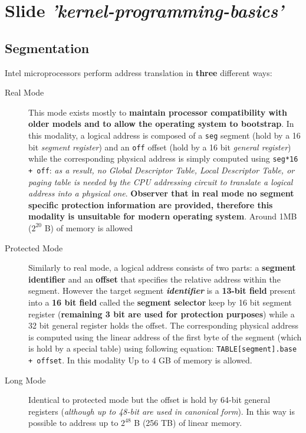 \documentclass[10pt,a4paper]{article}
\begin{document}
\newpage
\section{Slide \textit{'kernel-programming-basics'}}

\subsection{Segmentation}

Intel microprocessors perform address translation in \textbf{three} different ways:
\begin{description}
\item[Real Mode] This mode exists mostly to \textbf{maintain processor compatibility with older models and to allow the operating system to bootstrap}. In this modality, a logical address is composed of a \texttt{seg} segment (hold by a 16 bit \textit{segment register}) and an \texttt{off} offset (hold by a 16 bit \textit{general register}) while the corresponding physical address is simply computed using \texttt{seg*16 + off}: \textit{as a result, no Global Descriptor Table, Local Descriptor Table, or paging table is needed by the CPU addressing circuit to translate a logical address into a physical one}. \textbf{Observer that in real mode no segment specific protection information are provided, therefore this modality is unsuitable for modern operating system}. Around 1MB ($2^20$ B) of memory is allowed
\item[Protected Mode] Similarly to real mode, a logical address consists of two parts: a \textbf{segment identifier} and an \textbf{offset} that specifies the relative address within the segment. However the target segment \textit{\textbf{identifier}} is a \textbf{13-bit field} present into a \textbf{16 bit field} called the \textbf{segment selector} keep by 16 bit segment register (\textbf{remaining 3 bit are used for protection purposes}) while a 32 bit general register holds the offset. The corresponding physical address is computed using the linear address of the first byte of the segment (which is hold by a special table) using following equation: \texttt{TABLE[segment].base + offset}. In this modality Up to 4 GB of memory is allowed.
\item[Long Mode] Identical to protected mode but the offset is hold by 64-bit general registers (\textit{although up to 48-bit are used in canonical form}). In this way is possible to address up to $2^{48}$ B (256 TB) of linear memory.
\end{description}
\end{document}
